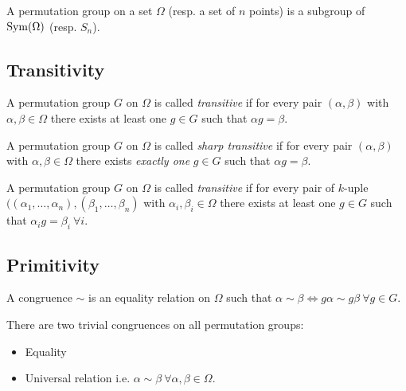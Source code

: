 \begin{definition}
  A permutation group on a set $\Omega$ (resp. a set of $n$ points) is a subgroup of $\operatorname{Sym}(\Omega)$ (resp. $S_n$).
\end{definition}

\subsection{Transitivity}

\begin{definition}
  A permutation group $G$ on $\Omega$ is called \textit{transitive} if for every pair $(\alpha, \beta)$ with $\alpha, \beta \in \Omega$ there exists at least one $g \in G$ such that $\alpha g = \beta$.
\end{definition}

\begin{definition}
  A permutation group $G$ on $\Omega$ is called \textit{sharp transitive} if for every pair $(\alpha, \beta)$ with $\alpha, \beta \in \Omega$ there exists \textit{exactly one} $g \in G$ such that $\alpha g = \beta$.
\end{definition}

\begin{definition}
  A permutation group $G$ on $\Omega$ is called \textit{transitive} if for every pair of $k$-uple $((\alpha_1, \dots, \alpha_n), (\beta_1, \dots, \beta_n)$ with $\alpha_i, \beta_i \in \Omega$ there exists at least one $g \in G$ such that $\alpha_i g = \beta_i \  \forall i$.
\end{definition}

\subsection{Primitivity}

\begin{definition}[Congruence]
  A congruence $\sim$ is an equality relation on $\Omega$ such that $\alpha \sim \beta \Leftrightarrow g\alpha \sim g\beta \ \forall g \in G$.
\end{definition}

There are two trivial congruences on all permutation groups:
\begin{itemize}
  \item Equality
  \item Universal relation i.e. $\alpha \sim \beta \ \forall \alpha, \beta \in \Omega$.
\end{itemize}


